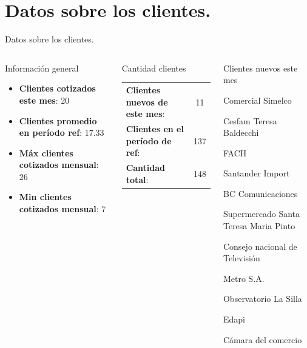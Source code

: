 \documentclass[aspectratio=169,xcolor=dvipsnames]{beamer}
\begin{document}
\section{Datos sobre los clientes.}
\begin{frame}{Datos sobre los clientes.}


\begin{columns}[c]
\begin{block}{Información general}
\begin{itemize}
    \item \textbf{Clientes cotizados este mes}: 20
    \item \textbf{Clientes promedio en período ref}: 17.33
    \item \textbf{Máx clientes cotizados mensual}: 26
    \item \textbf{Min clientes cotizados mensual}: 7
\end{itemize}
\end{block}
 
\begin{block}{Cantidad clientes}
\begin{tabular}{lc}
    \textbf{Clientes nuevos de este mes}:& 11 \\
     \textbf{Clientes en el período de ref}: & 137 \\ \hline
     \textbf{Cantidad total}: & 148
\end{tabular}
\end{block}

 \begin{block}{Clientes nuevos este mes}
     \begin{itemize}
    \tiny{
    \item Comercial Simelco
    \item Cesfam Teresa Baldecchi
    \item FACH
    \item Santander Import
    \item BC Comunicaciones
    \item Supermercado Santa Teresa Maria Pinto
    \item Consejo nacional de Televisión
    \item Metro S.A.
    \item Observatorio La Silla
    \item Edapi
    \item Cámara del comercio}
    \end{itemize}
 \end{block}
\end{columns}

\end{frame}
\end{document}
